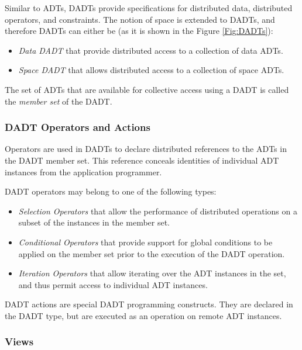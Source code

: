 Similar to ADTs, DADTs 
provide specifications for distributed data, distributed operators, and 
constraints. The notion of space is extended to DADTs, and therefore DADTs can
either be (as it is shown in the Figure \ref{Fig:DADTs}):

\begin{itemize}
  \item \emph{Data DADT} that provide distributed access to a collection of data
  ADTs.
  \item \emph{Space DADT} that allows distributed access to a collection of
  space ADTs. 
\end{itemize}

The set of ADTs that are available for collective access using a DADT is called the \emph{member set} of
the DADT.

\subsubsection{DADT Operators and Actions} \label{subsubsec:OperatorsAndActions}

Operators are used in DADTs to declare distributed references to
the ADTs in the DADT member set. This reference conceals identities of individual ADT
instances from the application programmer. 

DADT operators may belong to one of the following types:

\begin{itemize}
  \item \emph{Selection Operators} that allow the performance of
  distributed operations on a subset of the instances in the member set.
  \item \emph{Conditional Operators} that provide support for global
  conditions to be applied on the member set prior to the execution of the DADT operation.
  \item \emph{Iteration Operators} that allow iterating over the
  ADT instances in the set, and thus permit access to individual ADT instances.
\end{itemize}

DADT actions are special DADT programming constructs. They are declared in the
DADT type, but are executed as an operation on remote ADT instances. 


\subsubsection{Views} \label{subsubsec:views}

